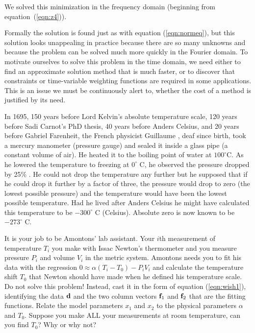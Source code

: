 We solved this minimization
in the frequency domain
(beginning from equation~(\ref{eqn:z4})).
\par
Formally the solution is found just as with equation (\ref{eqn:normeq}),
but this solution looks unappealing in practice
because there are so many unknowns and because
the problem can be solved much more quickly
in the Fourier domain.
To motivate ourselves to solve this problem in the time domain,
we need either to find an approximate solution method that is
much faster, or to discover that
constraints or time-variable weighting functions
are required in some applications.
This is an issue we must be continuously alert to,
whether the cost of a method is justified by its need.









\begin{exer}
\item
{}
In 1695, 150 years before Lord Kelvin's absolute temperature scale,
120 years before Sadi Carnot's PhD thesis,
40 years before Anders Celsius,
and 20 years before Gabriel Farenheit,
the French physicist Guillaume
,
deaf since birth,
took a mercury manometer (pressure gauge) and
sealed it inside a glass pipe (a constant volume of air).
He heated it to the boiling point of water at $100^\circ$C.
As he lowered the temperature to freezing at $0^\circ$ C,
he observed the pressure dropped by 25\% .
He could not drop the temperature any further
but he supposed that if he could drop it further by a factor of three,
the pressure would drop to zero (the lowest possible pressure)
and the temperature would have been the lowest possible temperature.
Had he lived after Anders Celsius he might have calculated
this temperature to be $-300^\circ$ C (Celsius).
Absolute zero is now known to be $-273^\circ$ C.
\par
It is your job to be Amontons' lab assistant.
Your $i$th measurement of temperature
$T_i$ you make with Issac Newton's thermometer and
you measure pressure $P_i$ and volume $V_i$ in the metric system.
Amontons needs you to fit his data with the regression
$
0\approx \alpha(T_i-T_0)-P_i V_i
$
and calculate the temperature shift $T_0$ that Newton should have made
when he defined his temperature scale.
Do not solve this problem!
Instead, cast it in the form of equation (\ref{eqn:wish1}),
identifying the data $\bold d$ and the two column vectors
$\bold f_1$ and
$\bold f_2$
that are the fitting functions.
Relate the model parameters $x_1$ and $x_2$
to the physical parameters $\alpha$ and $T_0$.
Suppose you make ALL your measurements at room temperature,
can you find $T_0$?  Why or why not?

\end{exer}


